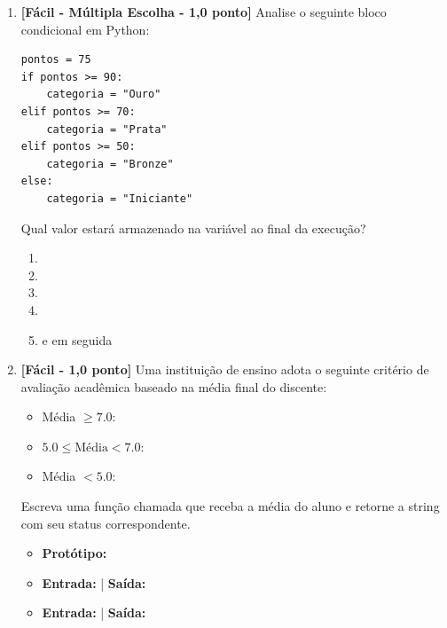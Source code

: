 \begin{enumerate}[label=\textbf{Q\arabic*.}, start=11]


\vspace{0.4cm}

\item \textbf{[Fácil - Múltipla Escolha - 1,0 ponto]} Analise o seguinte bloco condicional em Python:
\begin{verbatim}
pontos = 75
if pontos >= 90:
    categoria = "Ouro"
elif pontos >= 70:
    categoria = "Prata"
elif pontos >= 50:
    categoria = "Bronze"
else:
    categoria = "Iniciante"
\end{verbatim}
Qual valor estará armazenado na variável  ao final da execução?

\begin{enumerate}[label=\textbf{(\Alph*)}]
    \item {}
    \item {}
    \item {}
    \item {}
    \item {} e em seguida 
\end{enumerate}



\vspace{0.4cm}

\item \textbf{[Fácil - 1,0 ponto]} Uma instituição de ensino adota o seguinte critério de avaliação acadêmica baseado na média final do discente:
\begin{itemize}
    \item Média $\ge 7.0$: 
    \item $5.0 \le \text{Média} < 7.0$: 
    \item Média $< 5.0$: 
\end{itemize}
Escreva uma função chamada  que receba a média do aluno e retorne a string com seu status correspondente.

\begin{itemize}[leftmargin=*]
    \item \textbf{Protótipo:}\newline {}
    \item \textbf{Entrada:}  | \textbf{Saída:} 
    \item \textbf{Entrada:}  | \textbf{Saída:} 
\end{itemize}


\end{enumerate}
